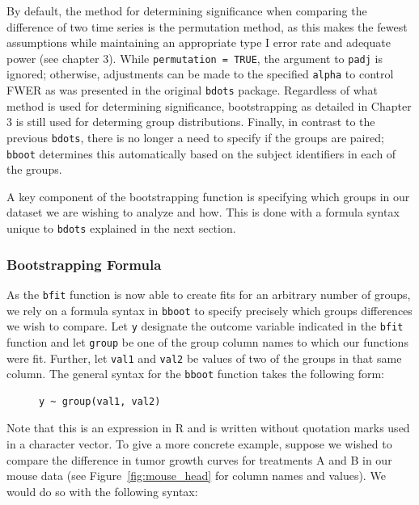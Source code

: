 \documentclass{article}
\newcommand{\xt}{\texttt}%
\begin{document}
By default, the method for determining significance when comparing the difference of two time series is the permutation method, as this makes the fewest assumptions while maintaining an appropriate type I error rate and adequate power (see chapter 3). While \xt{permutation = TRUE}, the argument to \xt{padj} is ignored; otherwise, adjustments can be made to the specified \xt{alpha} to control FWER as was presented in the original \xt{bdots} package. Regardless of what method is used for determining significance, bootstrapping as detailed in Chapter 3 is still used for determing group distributions. Finally, in contrast to the previous \xt{bdots}, there is no longer a need to specify if the groups are paired; \xt{bboot} determines this automatically based on the subject identifiers in each of the groups.

A key component of the bootstrapping function is specifying which groups in our dataset we are wishing to analyze and how. This is done with a formula syntax unique to \xt{bdots} explained in the next section.

\subsubsection{Bootstrapping Formula}

As the \xt{bfit} function is now able to create fits for an arbitrary number of groups, we rely on a formula syntax in \xt{bboot} to specify precisely which groups differences we wish to compare. Let \xt{y} designate the outcome variable indicated in the \xt{bfit} function and let \xt{group} be one of the group column names to which our functions were fit. Further, let \xt{val1} and \xt{val2} be values of two of the groups in that same column. The general syntax for the \xt{bboot} function takes the following form:

\begin{singlespace}
\begin{figure}[H]
\centering
\begin{BVerbatim}
y ~ group(val1, val2)
\end{BVerbatim}
\end{figure}
\end{singlespace}
Note that this is an expression in R and is written without quotation marks used in a character vector. To give a more concrete example, suppose we wished to compare the difference in tumor growth curves for treatments A and B in our mouse data (see Figure~\ref{fig:mouse_head} for column names and values). We would do so with the following syntax:
\end{document}
